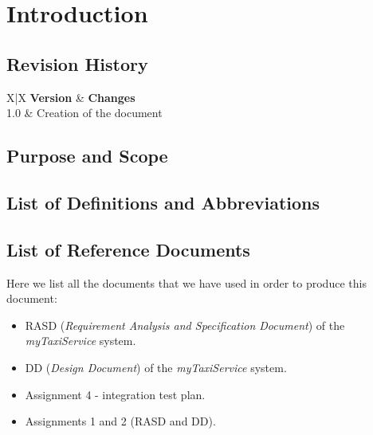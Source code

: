 \section{Introduction} %
\label{sec:introduction}

\subsection{Revision History} %
\label{sub:revision_history}
\begin{tabularx}{\textwidth}{ X|X }
	\textbf{Version} & \textbf{Changes} \\ \hline
	 {1.0} & Creation of the document \\
\end{tabularx}

\subsection{Purpose and Scope} %
\label{sub:purpose_and_scope}


\subsection{List of Definitions and Abbreviations} %
\label{sub:definitions_and_abbreviations}

\subsection{List of Reference Documents} %
\label{sub:reference_documents}
Here we list all the documents that we have used in order to produce this document:
\begin{itemize}
	\item RASD (\emph{Requirement Analysis and Specification Document}) of the \emph{myTaxiService} system.
	\item DD (\emph{Design Document}) of the \emph{myTaxiService} system.
	\item Assignment 4 - integration test plan.
	\item Assignments 1 and 2 (RASD and DD).
\end{itemize}
